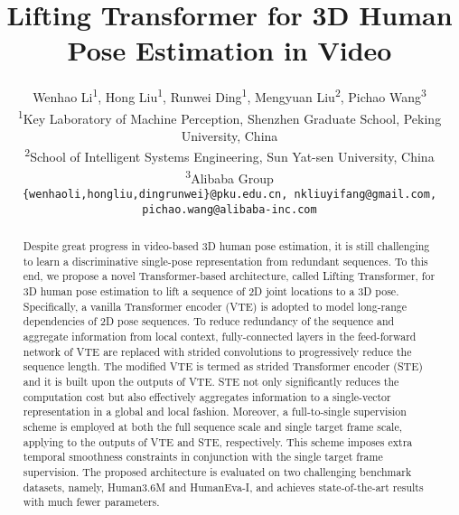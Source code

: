 \documentclass[10pt,twocolumn,letterpaper]{article}
\begin{document}
\title{Lifting Transformer for 3D Human Pose Estimation in Video} 

\author{
   Wenhao Li\textsuperscript{1}, 
   Hong Liu\textsuperscript{1},
   Runwei Ding\textsuperscript{1},
   Mengyuan Liu\textsuperscript{2}, 
   Pichao Wang\textsuperscript{3} \\
   \textsuperscript{1}Key Laboratory of Machine Perception, Shenzhen Graduate School, Peking University, China \\
   \textsuperscript{2}School of Intelligent Systems Engineering, Sun Yat-sen University, China \\
   \textsuperscript{3}Alibaba Group \\
   {\tt\small \{wenhaoli,hongliu,dingrunwei\}@pku.edu.cn, nkliuyifang@gmail.com, pichao.wang@alibaba-inc.com}
}

\maketitle

\ificcvfinal\thispagestyle{empty}\fi

\begin{abstract}   
Despite great progress in video-based 3D human pose estimation, it is still challenging to learn a discriminative single-pose representation from redundant sequences. To this end, we propose a novel Transformer-based architecture, called Lifting Transformer, for 3D human pose estimation to lift a sequence of 2D joint locations to a 3D pose. Specifically, a vanilla Transformer encoder (VTE) is adopted to model long-range dependencies of 2D pose sequences. To reduce redundancy of the sequence and aggregate information from local context, fully-connected layers in the feed-forward network of VTE are replaced with strided convolutions to progressively reduce the sequence length. The modified VTE is termed as strided Transformer encoder (STE) and it is built upon the outputs of VTE. STE not only significantly reduces the computation cost but also effectively aggregates information to a single-vector representation in a global and local fashion. Moreover, a full-to-single supervision scheme is employed at both the full sequence scale and single target frame scale, applying to the outputs of VTE and STE, respectively. This scheme imposes extra temporal smoothness constraints in conjunction with the single target frame supervision. The proposed architecture is evaluated on two challenging benchmark datasets, namely, Human3.6M and HumanEva-I, and achieves state-of-the-art results with much fewer parameters. 
\end{abstract}
\end{document}
